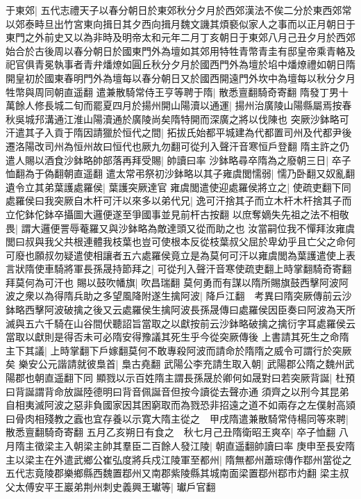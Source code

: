 于東郊|{
	五代志禮天子以春分朝日於東郊秋分夕月於西郊漢法不俟二分於東西郊常以郊泰畤旦出竹宮東向揖日其夕西向揖月魏文譏其煩褻似家人之事而以正月朝日于東門之外前史又以為非時及明帝太和元年二月丁亥朝日于東郊八月己丑夕月於西郊始合於古後周以春分朝日於國東門外為壇如其郊用特牲青幣青圭有邸皇帝乘青輅及祀官俱青冕執事者青弁燔燎如圓丘秋分夕月於國西門外為壇於埳中燔燎禮如朝日隋開皇初於國東春明門外為壇每以春分朝日又於國西開遠門外坎中為壇每以秋分夕月牲幣與周同朝直遥翻}
遣兼散騎常侍王亨等聘于隋|{
	散悉亶翻騎奇寄翻}
隋發丁男十萬餘人修長城二旬而罷夏四月於揚州開山陽瀆以通運|{
	揚州治廣陵山陽縣屬焉按春秋吳城䢴溝通江淮山陽瀆通於廣陵尚矣隋特開而深廣之將以伐陳也}
突厥沙鉢略可汗遣其子入貢于隋因請獵於恒代之間|{
	拓拔氏始都平城建為代都置司州及代都尹後遷洛陽改司州為恒州故曰恒代也厥九勿翻可從刋入聲汗音寒恒戶登翻}
隋主許之仍遣人賜以酒食沙鉢略帥部落再拜受賜|{
	帥讀曰率}
沙鉢略尋卒隋為之廢朝三日|{
	卒子恤翻為于偽翻朝直遥翻}
遣太常弔祭初沙鉢略以其子雍虞閭懦弱|{
	懦乃卧翻又奴亂翻}
遺令立其弟葉護處羅侯|{
	葉護突厥達官}
雍虞閭遣使迎處羅侯將立之|{
	使疏吏翻下同}
處羅侯曰我突厥自木杆可汗以來多以弟代兄|{
	逸可汗捨其子而立木杆木杆捨其子而立佗鉢佗鉢卒攝圖大邏便遂至爭國事並見前杆古按翻}
以庶奪嫡失先祖之法不相敬畏|{
	謂大邏便詈辱菴羅又與沙鉢略為敵達頭又從而助之也}
汝當嗣位我不憚拜汝雍虞閭曰叔與我父共根連體我枝葉也豈可使根本反從枝葉叔父屈於卑幼乎且亡父之命何可廢也願叔勿疑遣使相讓者五六處羅侯竟立是為莫何可汗以雍虞閭為葉護遣使上表言狀隋使車騎將軍長孫晟持節拜之|{
	可從刋入聲汗音寒使疏吏翻上時掌翻騎奇寄翻拜莫何為可汗也}
賜以鼓吹幡旗|{
	吹昌瑞翻}
莫何勇而有謀以隋所賜旗鼓西擊阿波阿波之衆以為得隋兵助之多望風降附遂生擒阿波|{
	降戶江翻　考異曰隋突厥傳前云沙鉢略西擊阿波破擒之後又云處羅侯生擒阿波長孫晟傳曰處羅侯因臣奏曰阿波為天所滅與五六千騎在山谷間伏聽詔旨當取之以獻按前云沙鉢略破擒之擒衍字耳處羅侯云當取以獻則是得否未可必隋安得豫議其死生乎今從突厥傳後}
上書請其死生之命隋主下其議|{
	上時掌翻下戶嫁翻莫何不敢專殺阿波而請命於隋隋之威令可謂行於突厥矣}
樂安公元諧請就彼梟首|{
	梟古堯翻}
武陽公李充請生取入朝|{
	武陽郡公隋之魏州武陽郡也朝直遥翻下同}
顯戮以示百姓隋主謂長孫晟於卿何如晟對曰若突厥背誕|{
	杜預曰背誕謂背命放誕陸德明曰背音佩誕音但按今讀從去聲亦通}
須齊之以刑今其昆弟自相夷滅阿波之惡非負國家因其困窮取而為戮恐非招遠之道不如兩存之左僕射高熲曰骨肉相殘教之蠧也宜存養以示寛大隋主從之　甲戌隋遣兼散騎常侍楊同等來聘|{
	散悉亶翻騎奇寄翻}
五月乙亥朔日有食之　秋七月己丑隋衛昭王爽卒|{
	卒子恤翻}
八月隋主徵梁主入朝梁主帥其羣臣二百餘人發江陵|{
	朝直遥翻帥讀曰率}
庚申至長安隋主以梁主在外遣武鄉公崔弘度將兵戍江陵軍至都州|{
	隋無都州蕭琮傳作鄀州當從之五代志竟陵郡樂鄉縣西魏置鄀州又南郡紫陵縣其城南面梁置鄀州鄀市灼翻}
梁主叔父太傅安平王巖弟荆州刺史義興王瓛等|{
	瓛戶官翻}
